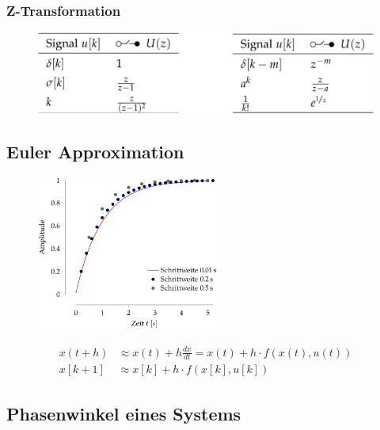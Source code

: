 \documentclass[
  10pt,
  a4paper,
  twocolumn]{article}
\numberwithin{equation}{section}
\begin{document}
\hypertarget{z-transformation-2}{%
\subsubsection{Z-Transformation}\label{z-transformation-2}}

\begin{figure}[H]

{\centering \includegraphics{images/paste-18.png}

}

\end{figure}

\hypertarget{euler-approximation}{%
\subsection{Euler Approximation}\label{euler-approximation}}

\begin{figure}[H]

{\centering \includegraphics[width=6cm,height=\textheight]{images/paste-32.png}

}

\end{figure}

\[
\begin{split}
x(t+h) &\approx x(t) + h\frac{dx}{dt}=x(t)+h\cdot f(x(t),u(t)) \\
x[k+1] &\approx x[k] + h\cdot f(x[k],u[k])
\end{split}
\]

\hypertarget{phasenwinkel-eines-systems}{%
\subsection{Phasenwinkel eines
Systems}\label{phasenwinkel-eines-systems}}
\end{document}

